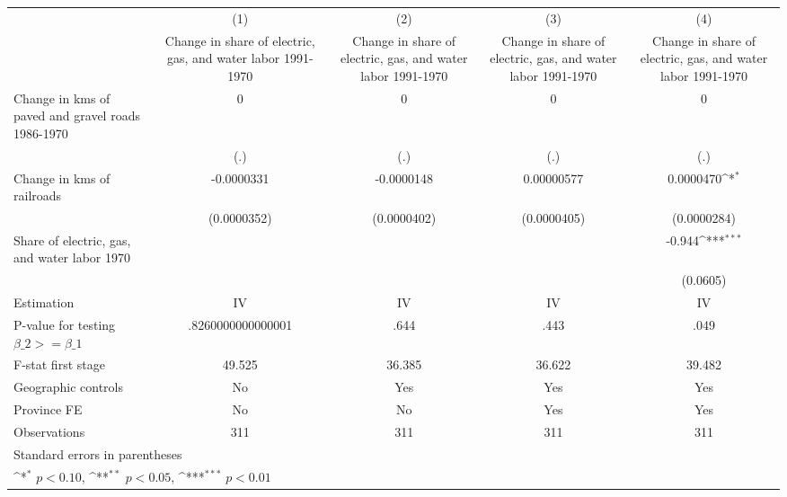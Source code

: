 {
\def\sym#1{\ifmmode^{#1}\else\(^{#1}\)\fi}
\begin{tabular}{l*{4}{c}}
\hline\hline
                    &\multicolumn{1}{c}{(1)}&\multicolumn{1}{c}{(2)}&\multicolumn{1}{c}{(3)}&\multicolumn{1}{c}{(4)}\\
                    &\multicolumn{1}{c}{Change in share of electric, gas, and water labor 1991-1970}&\multicolumn{1}{c}{Change in share of electric, gas, and water labor 1991-1970}&\multicolumn{1}{c}{Change in share of electric, gas, and water labor 1991-1970}&\multicolumn{1}{c}{Change in share of electric, gas, and water labor 1991-1970}\\
\hline
Change in kms of paved and gravel roads 1986-1970&           0         &           0         &           0         &           0         \\
                    &         (.)         &         (.)         &         (.)         &         (.)         \\
[1em]
Change in kms of railroads&  -0.0000331         &  -0.0000148         &  0.00000577         &   0.0000470\sym{*}  \\
                    & (0.0000352)         & (0.0000402)         & (0.0000405)         & (0.0000284)         \\
[1em]
Share of electric, gas, and water labor 1970&                     &                     &                     &      -0.944\sym{***}\\
                    &                     &                     &                     &    (0.0605)         \\
\hline
Estimation          &          IV         &          IV         &          IV         &          IV         \\
P-value for testing $\beta\_2 >= \beta\_1$&.8260000000000001         &        .644         &        .443         &        .049         \\
F-stat first stage  &      49.525         &      36.385         &      36.622         &      39.482         \\
Geographic controls &          No         &         Yes         &         Yes         &         Yes         \\
Province FE         &          No         &          No         &         Yes         &         Yes         \\
Observations        &         311         &         311         &         311         &         311         \\
\hline\hline
\multicolumn{5}{l}{\footnotesize Standard errors in parentheses}\\
\multicolumn{5}{l}{\footnotesize \sym{*} \(p<0.10\), \sym{**} \(p<0.05\), \sym{***} \(p<0.01\)}\\
\end{tabular}
}
